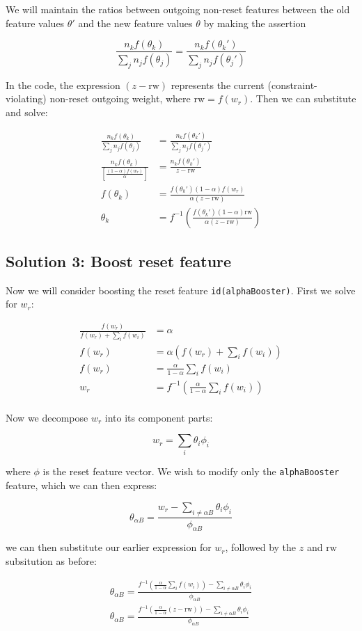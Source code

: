 \documentclass{article}
\begin{document}
We will maintain the ratios between outgoing non-reset features between the old feature values $\theta'$ and the new feature values $\theta$ by making the assertion

$$\frac{n_kf(\theta_k)}{\sum\limits_j n_jf(\theta_j)} = \frac{n_kf(\theta_k')}{\sum\limits_j n_jf(\theta_j')}$$

In the code, the expression $(z-\mathrm{rw})$ represents the current (constraint-violating) non-reset outgoing weight, where $\mathrm{rw}=f(w_r)$. Then we can substitute and solve:

\begin{align*}
\frac{n_kf(\theta_k)}{\sum\limits_j n_jf(\theta_j)} &= \frac{n_kf(\theta_k')}{\sum\limits_j n_jf(\theta_j')}\\
\frac{n_kf(\theta_k)}{\left[\frac{(1-\alpha)f(w_r)}{\alpha}\right]} &= \frac{n_kf(\theta_k')}{z-\mathrm{rw}}\\
f(\theta_k) &= \frac{f(\theta_k')(1-\alpha)f(w_r)}{\alpha(z-\mathrm{rw})}\\
\theta_k &= f^{-1}\left(\frac{f(\theta_k')(1-\alpha)\mathrm{rw}}{\alpha(z-\mathrm{rw})}\right)
\end{align*}

\subsection*{Solution 3: Boost reset feature}
Now we will consider boosting the reset feature {\tt id(alphaBooster)}. First we solve for $w_r$:

\begin{align*}
\frac{f(w_r)}{f(w_r) + \sum\limits_i f(w_i)} & =   \alpha\\
f(w_r) &= \alpha(f(w_r) + \sum\limits_i f(w_i))\\
f(w_r) &= \frac{\alpha}{1-\alpha}\sum\limits_i f(w_i)\\
w_r &= f^{-1}\left(\frac{\alpha}{1-\alpha}\sum\limits_i f(w_i)\right)\\
\end{align*}

Now we decompose $w_r$ into its component parts:

$$w_r = \sum\limits_i \theta_i\phi_i$$

where $\phi$ is the reset feature vector. We wish to modify only the {\tt alphaBooster} feature, which we can then express:

$$\theta_{\alpha B} = \frac{w_r - \sum\limits_{i\ne\alpha B} \theta_i\phi_i}{\phi_{\alpha B}}$$

we can then substitute our earlier expression for $w_r$, followed by the $z$ and $\mathrm{rw}$ subsitution as before:

\begin{align*}
\theta_{\alpha B} = \frac{f^{-1}\left(\frac{\alpha}{1-\alpha}\sum\limits_i f(w_i)\right) - \sum\limits_{i\ne\alpha B} \theta_i\phi_i}{\phi_{\alpha B}} \\
\theta_{\alpha B} = \frac{f^{-1}\left(\frac{\alpha}{1-\alpha}(z-\mathrm{rw})\right) - \sum\limits_{i\ne\alpha B} \theta_i\phi_i}{\phi_{\alpha B}} \\
\end{align*}
\end{document}
